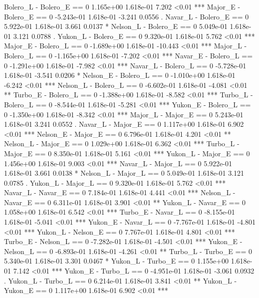 Bolero_L - Bolero_E == 0  1.165e+00  1.618e-01     7.202    <0.01 ***
Major_E - Bolero_E == 0  -5.243e-01  1.618e-01    -3.241   0.0556 .  
Navar_L - Bolero_E == 0   5.922e-01  1.618e-01     3.661   0.0137 *  
Nelson_L - Bolero_E == 0  5.049e-01  1.618e-01     3.121   0.0788 .  
Yukon_L - Bolero_E == 0   9.320e-01  1.618e-01     5.762    <0.01 ***
Major_E - Bolero_L == 0  -1.689e+00  1.618e-01   -10.443    <0.01 ***
Major_L - Bolero_L == 0  -1.165e+00  1.618e-01    -7.202    <0.01 ***
Navar_E - Bolero_L == 0  -1.291e+00  1.618e-01    -7.982    <0.01 ***
Navar_L - Bolero_L == 0  -5.728e-01  1.618e-01    -3.541   0.0206 *  
Nelson_E - Bolero_L == 0 -1.010e+00  1.618e-01    -6.242    <0.01 ***
Nelson_L - Bolero_L == 0 -6.602e-01  1.618e-01    -4.081    <0.01 ** 
Turbo_E - Bolero_L == 0  -1.388e+00  1.618e-01    -8.582    <0.01 ***
Turbo_L - Bolero_L == 0  -8.544e-01  1.618e-01    -5.281    <0.01 ***
Yukon_E - Bolero_L == 0  -1.350e+00  1.618e-01    -8.342    <0.01 ***
Major_L - Major_E == 0    5.243e-01  1.618e-01     3.241   0.0552 .  
Navar_L - Major_E == 0    1.117e+00  1.618e-01     6.902    <0.01 ***
Nelson_E - Major_E == 0   6.796e-01  1.618e-01     4.201    <0.01 ** 
Nelson_L - Major_E == 0   1.029e+00  1.618e-01     6.362    <0.01 ***
Turbo_L - Major_E == 0    8.350e-01  1.618e-01     5.161    <0.01 ***
Yukon_L - Major_E == 0    1.456e+00  1.618e-01     9.003    <0.01 ***
Navar_L - Major_L == 0    5.922e-01  1.618e-01     3.661   0.0138 *  
Nelson_L - Major_L == 0   5.049e-01  1.618e-01     3.121   0.0785 .  
Yukon_L - Major_L == 0    9.320e-01  1.618e-01     5.762    <0.01 ***
Navar_L - Navar_E == 0    7.184e-01  1.618e-01     4.441    <0.01 ***
Nelson_L - Navar_E == 0   6.311e-01  1.618e-01     3.901    <0.01 ** 
Yukon_L - Navar_E == 0    1.058e+00  1.618e-01     6.542    <0.01 ***
Turbo_E - Navar_L == 0   -8.155e-01  1.618e-01    -5.041    <0.01 ***
Yukon_E - Navar_L == 0   -7.767e-01  1.618e-01    -4.801    <0.01 ***
Yukon_L - Nelson_E == 0   7.767e-01  1.618e-01     4.801    <0.01 ***
Turbo_E - Nelson_L == 0  -7.282e-01  1.618e-01    -4.501    <0.01 ***
Yukon_E - Nelson_L == 0  -6.893e-01  1.618e-01    -4.261    <0.01 ** 
Turbo_L - Turbo_E == 0    5.340e-01  1.618e-01     3.301   0.0467 *  
Yukon_L - Turbo_E == 0    1.155e+00  1.618e-01     7.142    <0.01 ***
Yukon_E - Turbo_L == 0   -4.951e-01  1.618e-01    -3.061   0.0932 .  
Yukon_L - Turbo_L == 0    6.214e-01  1.618e-01     3.841    <0.01 ** 
Yukon_L - Yukon_E == 0    1.117e+00  1.618e-01     6.902    <0.01 ***
